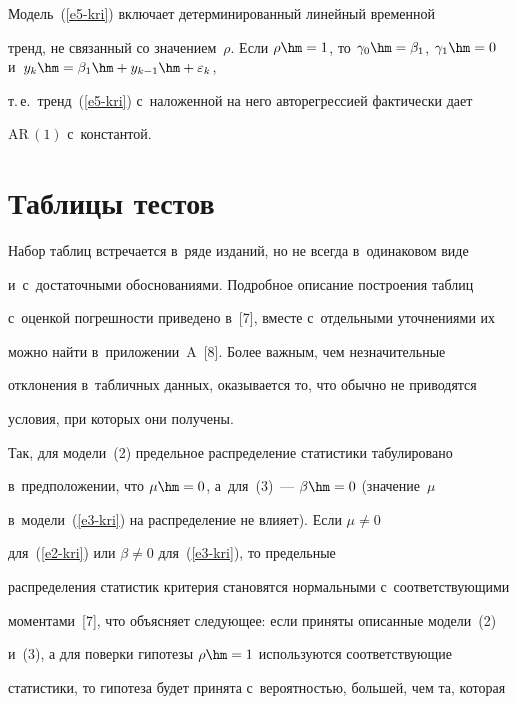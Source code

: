 Модель~(\ref{e5-kri}) включает детерминированный линейный временной 


тренд, не связанный со значением~$\rho$. Если $\rho\hm=1$, то $\gamma_0\hm= 


\beta_1$, $\gamma_1\hm=0$ и~$y_k\hm= \beta_1\hm+ y_{k-1} \hm+ \varepsilon_k$, 


т.\,е.\ тренд~(\ref{e5-kri}) с~наложенной на него авторегрессией фактически дает 


$\mathrm{AR}\,(1)$ с~константой. 





\section{Таблицы тестов}





     Набор таблиц встречается в~ряде изданий, но не всегда в~одинаковом виде 


     и~с~достаточными обоснованиями. Подробное описание по\-стро\-ения таб\-лиц 


     с~оценкой по\-греш\-ности приведено в~[7], вместе с~отдельными уточ\-не\-ни\-ями их 


мож\-но найти в~приложении~A~[8]. Более важным, чем незначительные 


отклонения в~табличных данных, оказывается то, что обычно не приводятся 


условия, при которых они получены. 


     


     Так, для модели~(2) предельное распределение статистики табулировано 


в~предположении, что $\mu\hm=0$, а~для~(3)~--- $\beta\hm=0$ (значение~$\mu$ 


в~модели~(\ref{e3-kri}) на распределение не влияет). Если $\mu\not= 0$ 


для~(\ref{e2-kri}) или $\beta\not= 0$ для~(\ref{e3-kri}), то предельные 


распределения статистик критерия становятся нормальными с~со\-от\-вет\-ст\-ву\-ющи\-ми 


моментами~[7], что объясняет следующее: если приняты описанные модели~(2) 


и~(3), а для поверки гипотезы $\rho\hm=1$ используются со\-от\-вет\-ст\-ву\-ющие 


статистики, то гипотеза будет принята с~ве\-ро\-ят\-ностью, большей, чем та, которая 


